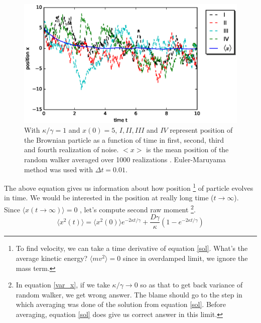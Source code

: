 \documentclass[11pt,a4paper]{article}
\begin{document}
\begin{figure}[!htbp]
\centering
\includegraphics[scale=0.67]{x_brown_realization.eps}
\caption{ With $\kappa/\gamma=1$ and $x(0)=5$, $I, II, III$ and $IV$ represent position of the Brownian particle as a function of time in first, second, third and fourth realization of noise. $<x>$ is the mean position of the random walker averaged  over 1000 realizations . Euler-Maruyama method was used with $\Delta t=0.01$. }
\label{meanx_brown}
\end{figure}


The above equation gives us information about how position \footnote{To find velocity, we can take a time derivative of equation \ref{sol}. What's the average kinetic energy? $\langle m v^2 \rangle =0 $ since in overdamped limit, we ignore the mass term.} of particle evolves in time.
We would be interested in the position at really long time ($t\rightarrow \infty$). Since $\langle x(t\rightarrow \infty) \rangle=0$ , let's compute second raw moment \footnote{In equation \ref{var_x}, if we take $\kappa /\gamma \rightarrow 0$ so as that to get back variance of random walker, we get wrong answer. The blame should go to the step in which averaging was done of the solution from equation \ref{sol}. Before averaging, equation \ref{sol} does give us correct answer in this limit. }.
\begin{equation}
\langle x^2 (t) \rangle = \langle x^2 (0) \rangle e^{-2\kappa t/\gamma} + \dfrac{D \gamma}{\kappa}(1-e^{-2\kappa t/\gamma})
\label{var_x}
\end{equation}
\end{document}
